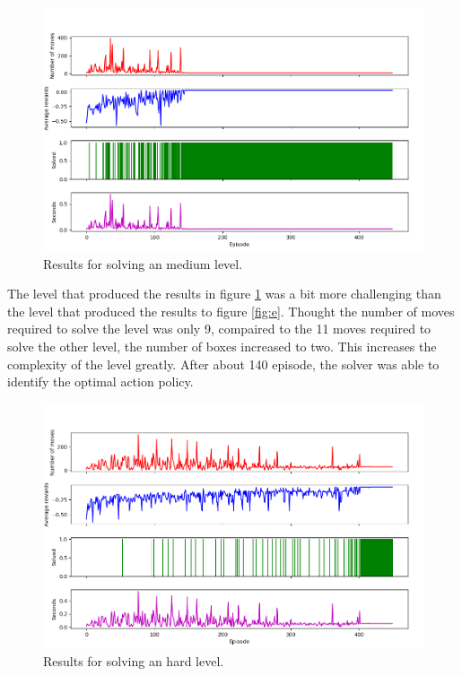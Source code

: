 \documentclass[times, 10pt,twocolumn]{article}
\begin{document}
\begin{figure}[h] 
  \centering
     \includegraphics[width=\linewidth]{images/medium_graph.png}
  \caption{Results for solving an medium level.}
  \label{fig:m}
\end{figure}

The level that produced the results in figure \ref{fig:m} was a bit more challenging than the level that produced the results to figure \ref{fig:e}. Thought the number of moves required to solve the level was only 9, compaired to the 11 moves required to solve the other level, the number of boxes increased to two. This increases the complexity of the level greatly. After about 140 episode, the solver was able to identify the optimal action policy.  

\begin{figure}[h] 
  \centering
     \includegraphics[width=\linewidth]{images/hard_graph.png}
  \caption{Results for solving an hard level.}
  \label{fig:h}
\end{figure}
\end{document}
